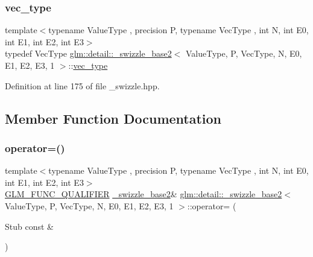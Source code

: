 \subsubsection{\texorpdfstring{vec\+\_\+type}{vec\_type}}
{\footnotesize\ttfamily template$<$typename Value\+Type , precision P, typename Vec\+Type , int N, int E0, int E1, int E2, int E3$>$ \\
typedef Vec\+Type \hyperlink{structglm_1_1detail_1_1__swizzle__base2}{glm\+::detail\+::\+\_\+swizzle\+\_\+base2}$<$ Value\+Type, P, Vec\+Type, N, E0, E1, E2, E3, 1 $>$\+::\hyperlink{structglm_1_1detail_1_1__swizzle__base2_3_01_value_type_00_01_p_00_01_vec_type_00_01_n_00_01_e0_fc19218d69dc8988a4a57fbe7f79725c_aa478e9f198b8832d76245adde9c627ec}{vec\+\_\+type}}



Definition at line 175 of file \+\_\+swizzle.\+hpp.



\subsection{Member Function Documentation}
\mbox{\label{structglm_1_1detail_1_1__swizzle__base2_3_01_value_type_00_01_p_00_01_vec_type_00_01_n_00_01_e0_fc19218d69dc8988a4a57fbe7f79725c_aed2b7223090d020e28af46eb33fe6729}} 
\subsubsection{\texorpdfstring{operator=()}{operator=()}}
{\footnotesize\ttfamily template$<$typename Value\+Type , precision P, typename Vec\+Type , int N, int E0, int E1, int E2, int E3$>$ \\
\hyperlink{setup_8hpp_a33fdea6f91c5f834105f7415e2a64407}{G\+L\+M\+\_\+\+F\+U\+N\+C\+\_\+\+Q\+U\+A\+L\+I\+F\+I\+ER} \hyperlink{structglm_1_1detail_1_1__swizzle__base2}{\+\_\+swizzle\+\_\+base2}\& \hyperlink{structglm_1_1detail_1_1__swizzle__base2}{glm\+::detail\+::\+\_\+swizzle\+\_\+base2}$<$ Value\+Type, P, Vec\+Type, N, E0, E1, E2, E3, 1 $>$\+::operator= (\begin{DoxyParamCaption}\item[{Stub const \&}]{ }\end{DoxyParamCaption})\hspace{0.3cm}{\ttfamily [inline]}}



